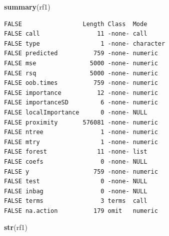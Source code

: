 \documentclass[]{book}
\newenvironment{Shaded}{\begin{snugshade}}{\end{snugshade}}
\newcommand{\KeywordTok}[1]{\textcolor[rgb]{0.13,0.29,0.53}{\textbf{#1}}}
\newcommand{\NormalTok}[1]{#1}
\begin{document}
\begin{Shaded}
\begin{Highlighting}[]
\KeywordTok{summary}\NormalTok{(rf1)}
\end{Highlighting}
\end{Shaded}

\begin{verbatim}
FALSE                 Length Class  Mode     
FALSE call                11 -none- call     
FALSE type                 1 -none- character
FALSE predicted          759 -none- numeric  
FALSE mse               5000 -none- numeric  
FALSE rsq               5000 -none- numeric  
FALSE oob.times          759 -none- numeric  
FALSE importance          12 -none- numeric  
FALSE importanceSD         6 -none- numeric  
FALSE localImportance      0 -none- NULL     
FALSE proximity       576081 -none- numeric  
FALSE ntree                1 -none- numeric  
FALSE mtry                 1 -none- numeric  
FALSE forest              11 -none- list     
FALSE coefs                0 -none- NULL     
FALSE y                  759 -none- numeric  
FALSE test                 0 -none- NULL     
FALSE inbag                0 -none- NULL     
FALSE terms                3 terms  call     
FALSE na.action          179 omit   numeric
\end{verbatim}

\begin{Shaded}
\begin{Highlighting}[]
\KeywordTok{str}\NormalTok{(rf1)}
\end{Highlighting}
\end{Shaded}
\end{document}
